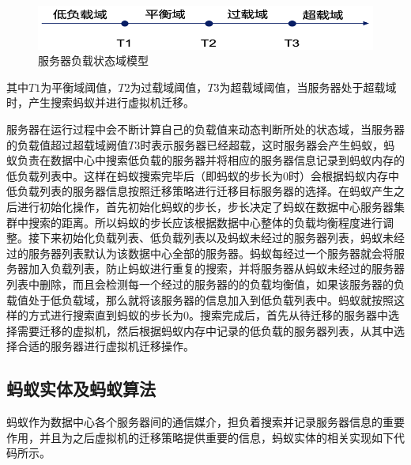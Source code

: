 \begin{figure}[htb]
  \centering
  \includegraphics{./Figure/IMG_Chap3_4.png}
  \caption{服务器负载状态域模型}\label{Fig:chap3_4}
\end{figure}

其中$ T1 $为平衡域阈值，$ T2 $为过载域阈值，$ T3 $为超载域阈值，当服务器处于超载域时，产生搜索蚂蚁并进行虚拟机迁移\cite{王光波}。

服务器在运行过程中会不断计算自己的负载值来动态判断所处的状态域，当服务器的负载值超过超载域阙值$ T3 $时表示服务器已经超载，这时服务器会产生蚂蚁，蚂蚁负责在数据中心中搜索低负载的服务器并将相应的服务器信息记录到蚂蚁内存的低负载列表中。这样在蚂蚁搜索完毕后（即蚂蚁的步长为0时）会根据蚂蚁内存中低负载列表的服务器信息按照迁移策略进行迁移目标服务器的选择。在蚂蚁产生之后进行初始化操作，首先初始化蚂蚁的步长，步长决定了蚂蚁在数据中心服务器集群中搜索的距离。所以蚂蚁的步长应该根据数据中心整体的负载均衡程度进行调整。接下来初始化负载列表、低负载列表以及蚂蚁未经过的服务器列表，蚂蚁未经过的服务器列表默认为该数据中心全部的服务器。蚂蚁每经过一个服务器就会将服务器加入负载列表，防止蚂蚁进行重复的搜索，并将服务器从蚂蚁未经过的服务器列表中删除，而且会检测每一个经过的服务器的的负载均衡值，如果该服务器的负载值处于低负载域，那么就将该服务器的信息加入到低负载列表中。蚂蚁就按照这样的方式进行搜索直到蚂蚁的步长为0。搜索完成后，首先从待迁移的服务器中选择需要迁移的虚拟机，然后根据蚂蚁内存中记录的低负载的服务器列表，从其中选择合适的服务器进行虚拟机迁移操作。

\subsection{蚂蚁实体及蚂蚁算法}
蚂蚁作为数据中心各个服务器间的通信媒介，担负着搜索并记录服务器信息的重要作用，并且为之后虚拟机的迁移策略提供重要的信息，蚂蚁实体的相关实现如下代码所示。

